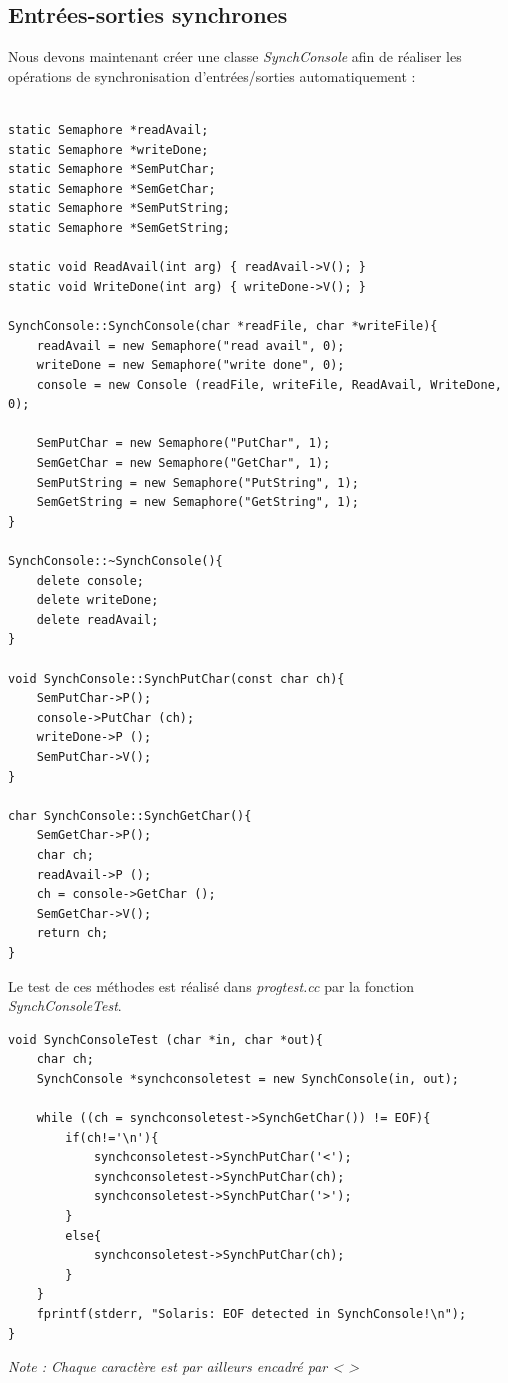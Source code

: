 \documentclass[a4paper,10pt]{article}
\begin{document}
\subsection{Entrées-sorties synchrones}
Nous devons maintenant créer une classe \textit{SynchConsole} afin de réaliser les opérations de synchronisation d'entrées/sorties automatiquement :
\begin{lstlisting}[frame=single]

static Semaphore *readAvail;
static Semaphore *writeDone;
static Semaphore *SemPutChar;
static Semaphore *SemGetChar;
static Semaphore *SemPutString;
static Semaphore *SemGetString;

static void ReadAvail(int arg) { readAvail->V(); }
static void WriteDone(int arg) { writeDone->V(); }

SynchConsole::SynchConsole(char *readFile, char *writeFile){
	readAvail = new Semaphore("read avail", 0);
	writeDone = new Semaphore("write done", 0);
	console = new Console (readFile, writeFile, ReadAvail, WriteDone, 0);

	SemPutChar = new Semaphore("PutChar", 1);
	SemGetChar = new Semaphore("GetChar", 1);
	SemPutString = new Semaphore("PutString", 1);
	SemGetString = new Semaphore("GetString", 1);
}

SynchConsole::~SynchConsole(){
	delete console;
	delete writeDone;
	delete readAvail;
}

void SynchConsole::SynchPutChar(const char ch){
	SemPutChar->P();
	console->PutChar (ch);
	writeDone->P ();
	SemPutChar->V();
}

char SynchConsole::SynchGetChar(){
	SemGetChar->P();
	char ch;
	readAvail->P ();
	ch = console->GetChar ();
	SemGetChar->V();
	return ch;
}
\end{lstlisting}
\newpage
Le test de ces méthodes est réalisé dans \textit{progtest.cc} par la fonction \textit{SynchConsoleTest}.
\begin{lstlisting}[frame=single]
 void SynchConsoleTest (char *in, char *out){
	char ch;
	SynchConsole *synchconsoletest = new SynchConsole(in, out);

	while ((ch = synchconsoletest->SynchGetChar()) != EOF){
		if(ch!='\n'){
			synchconsoletest->SynchPutChar('<');
			synchconsoletest->SynchPutChar(ch);
			synchconsoletest->SynchPutChar('>');
		}
		else{
			synchconsoletest->SynchPutChar(ch);
		}
	}
	fprintf(stderr, "Solaris: EOF detected in SynchConsole!\n");
}
\end{lstlisting}
\textit{Note : Chaque caractère est par ailleurs encadré par < >}
\end{document}
